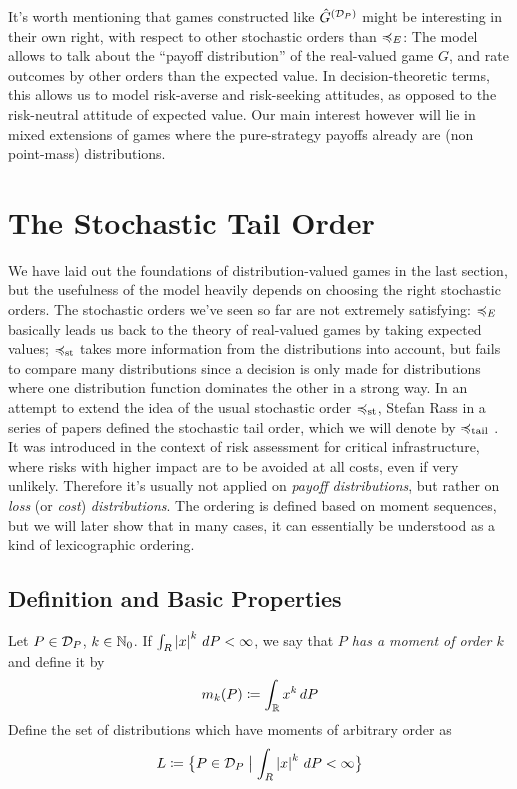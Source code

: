 \documentclass[a4paper]{scrreprt}
\begin{document}
    It's worth mentioning that games constructed like $\hat{G}^{(\mathcal{D}_P)}$ might be interesting in their own right, with respect to other stochastic orders than $\preccurlyeq_E$:
    The model allows to talk about the “payoff distribution” of the real-valued game $G$, and rate outcomes by other orders than the expected value. In decision-theoretic terms, this allows us to model risk-averse and risk-seeking attitudes, as opposed to the risk-neutral attitude of expected value. Our main interest however will lie in mixed extensions of games where the pure-strategy payoffs already are (non point-mass) distributions.

    
    \section{The Stochastic Tail Order}
    We have laid out the foundations of distribution-valued games in the last section, but the usefulness of the model heavily depends on choosing the right stochastic orders.
    The stochastic orders we've seen so far are not extremely satisfying: $\preccurlyeq_E$ basically leads us back to the theory of real-valued games by taking expected values; $\preccurlyeq_{\text{st}}$ takes more information from the distributions into account, but fails to compare many distributions since a decision is only made for distributions where one distribution function dominates the other in a strong way.
    In an attempt to extend the idea of the usual stochastic order $\preccurlyeq_{\text{st}}$, Stefan Rass in a series of papers defined the stochastic tail order, which we will denote by $\preccurlyeq_{\text{tail}}$ \cite{bib:rassGameRiskManagI,bib:rassGameRiskManagII,bib:rassTotalOrderingOnLossDistributions}.
    It was introduced in the context of risk assessment for critical infrastructure, where risks with higher impact are to  be avoided at all costs, even if very unlikely.
    Therefore it's usually not applied on \emph{payoff distributions}, but rather on \emph{loss} (or \emph{cost}) \emph{distributions}.
    The ordering is defined based on moment sequences, but we will later show that in many cases, it can essentially be understood as a kind of lexicographic ordering.

    \subsection{Definition and Basic Properties}    
    \newcommand{\Lallmoms}{L}
    \begin{defn}[Moments]
        Let $P \in \mathcal{D}_P$, $k \in \mathbb{N}_0$. If $\int_{R} \left| x \right|^k \, dP < \infty$, we say that \emph{$P$ has a moment of order $k$} and define it by
        \begin{gather*}
            m_k(P) \coloneqq \int_{\mathbb{R}} x^k \, dP
        \end{gather*}
        Define the set of distributions which have moments of arbitrary order as
        \begin{gather*}
            \Lallmoms \coloneqq \bigset{P \in \DP \bigmid \lintegral{R}{\abs{x}^k}{P} < \infty}
        \end{gather*}
    \end{defn}
\end{document}
